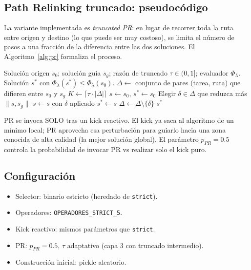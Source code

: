 \subsection{Path Relinking truncado: pseudocódigo}

La variante implementada es \emph{truncated PR}: en lugar de recorrer
toda la ruta entre origen y destino (lo que puede ser muy costoso), se
limita el número de pasos a una fracción de la diferencia entre las
dos soluciones. El Algoritmo~\ref{alg:pr} formaliza el proceso.

\begin{algorithm}[h]
\caption{Path Relinking truncado (capa 3).}
\label{alg:pr}
\begin{algorithmic}[1]
\Require Solución origen $s_0$; solución guía $s_g$; razón de truncado
  $\tau \in (0,1]$; evaluador $\Phi_\lambda$.
\Ensure Solución $s^*$ con $\Phi_\lambda(s^*) \le \Phi_\lambda(s_0)$.
\State $\Delta \gets$ conjunto de pares (tarea, ruta) que difieren entre $s_0$ y $s_g$
\State $K \gets \lceil \tau \cdot |\Delta| \rceil$
\State $s \gets s_0$, $s^* \gets s_0$
  \State Elegir $\delta \in \Delta$ que reduzca más $\|s, s_g\|$
  \State $s \gets s$ con $\delta$ aplicado
    \State $s^* \gets s$
  \EndIf
  \State $\Delta \gets \Delta \setminus \{\delta\}$
\EndFor
\State \Return $s^*$
\end{algorithmic}
\end{algorithm}

PR se invoca SOLO tras un kick reactivo. El kick ya saca al algoritmo
de un mínimo local; PR aprovecha esa perturbación para guiarlo hacia
una zona conocida de alta calidad (la mejor solución global). El
parámetro $p_{PR} = 0.5$ controla la probabilidad de invocar PR vs
realizar solo el kick puro.

\subsection{Configuración}

\begin{itemize}
\item Selector: binario estricto (heredado de \texttt{strict}).
\item Operadores: \texttt{OPERADORES\_STRICT\_5}.
\item Kick reactivo: mismos parámetros que \texttt{strict}.
\item PR: $p_{PR} = 0.5$, $\tau$ adaptativo (capa 3 con
  truncado intermedio).
\item Construcción inicial: pickle aleatorio.
\end{itemize}

